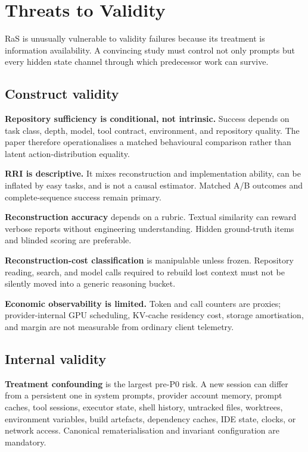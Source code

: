 \section{Threats to Validity}
\label{sec:threats}

RaS is unusually vulnerable to validity failures because its treatment is information availability. A convincing study must control not only prompts but every hidden state channel through which predecessor work can survive.

\subsection{Construct validity}

\textbf{Repository sufficiency is conditional, not intrinsic.} Success depends on task class, depth, model, tool contract, environment, and repository quality. The paper therefore operationalises a matched behavioural comparison rather than latent action-distribution equality.

\textbf{RRI is descriptive.} It mixes reconstruction and implementation ability, can be inflated by easy tasks, and is not a causal estimator. Matched A/B outcomes and complete-sequence success remain primary.

\textbf{Reconstruction accuracy} depends on a rubric. Textual similarity can reward verbose reports without engineering understanding. Hidden ground-truth items and blinded scoring are preferable.

\textbf{Reconstruction-cost classification} is manipulable unless frozen. Repository reading, search, and model calls required to rebuild lost context must not be silently moved into a generic reasoning bucket.

\textbf{Economic observability is limited.} Token and call counters are proxies; provider-internal GPU scheduling, KV-cache residency cost, storage amortisation, and margin are not measurable from ordinary client telemetry.

\subsection{Internal validity}

\textbf{Treatment confounding} is the largest pre-P0 risk. A new session can differ from a persistent one in system prompts, provider account memory, prompt caches, tool sessions, executor state, shell history, untracked files, worktrees, environment variables, build artefacts, dependency caches, IDE state, clocks, or network access. Canonical rematerialisation and invariant configuration are mandatory.

